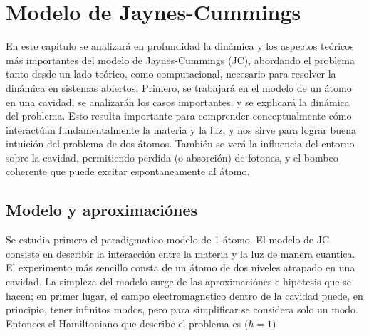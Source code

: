 \chapter{Modelo de Jaynes-Cummings}
\label{ch3_jcm}


\pagestyle{fancy}
\fancyhf{}
\fancyhead[LE]{\nouppercase{\rightmark\hfill}}
\fancyhead[RO]{\nouppercase{\leftmark\hfill}}
\fancyfoot[LE,RO]{\hfill\thepage\hfill}

En este capitulo se analizará en profundidad la din\'amica y los aspectos teóricos más importantes 
del modelo de Jaynes-Cummings (JC), abordando el problema tanto desde un lado te\'orico, como computacional, necesario para resolver la din\'amica en sistemas abiertos.
Primero, se trabajar\'a en el modelo de un átomo en una cavidad, se analizar\'an los casos importantes,
y se explicará la din\'amica del problema. Esto resulta importante para comprender conceptualmente cómo
interact\'uan fundamentalmente la materia y la luz, y nos sirve para lograr buena intuici\'on del
problema de dos átomos. También se ver\'a la influencia del entorno sobre la cavidad, permitiendo
perdida (o absorci\'on) de fotones, y el bombeo coherente que puede excitar espontaneamente
al átomo. \newline

\section{Modelo y aproximaciónes}
Se estudia primero el paradigmatico modelo de 1 átomo. El modelo de JC consiste en describir la interacción entre la materia y la luz de manera cuantica. El experimento más sencillo consta de un átomo de dos niveles atrapado en una cavidad. La simpleza del modelo surge de las aproximaciónes e hipotesis que se hacen; en primer lugar, el campo electromagnetico dentro de la cavidad puede, en principio, tener infinitos modos, pero para simplificar se considera solo un modo. 
Entonces el Hamiltoniano que describe el problema es ($\hbar = 1$)

